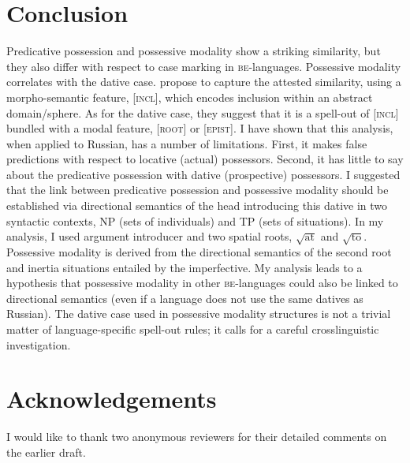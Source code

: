 \documentclass[output=paper,colorlinks,citecolor=brown,nonflat]{./langscibook}
\begin{document}
\section{Conclusion}\label{sec:tsedryk:5}

Predicative possession and possessive modality show a striking similarity, but they also differ with respect to case marking in \textsc{be}{}-languages. Possessive modality correlates with the dative case. \citet{BjorkmanCowper2016} propose to capture the attested similarity, using a morpho-semantic feature, [\textsc{incl}], which encodes inclusion within an abstract domain/sphere. As for the dative case, they suggest that it is a spell-out of [\textsc{incl}] bundled with a modal feature, [\textsc{root}] or [\textsc{epist}]. I have shown that this analysis, when applied to Russian, has a number of limitations. First, it makes false predictions with respect to locative (actual) possessors. Second, it has little to say about the predicative possession with dative (prospective) possessors. I suggested that the link between predicative possession and possessive modality should be established via directional semantics of the head introducing this dative in two syntactic contexts, NP (sets of individuals) and TP (sets of situations). In my analysis, I used  argument introducer and two spatial roots,  $\sqrt{\text{at}}$  and  $\sqrt{\text{to}}$. Possessive modality is derived from the directional semantics of the second root and inertia situations entailed by the imperfective. My analysis leads to a hypothesis that possessive modality in other \textsc{be}{}-languages could also be linked to directional semantics (even if a language does not use the same datives as Russian). The dative case used in possessive modality structures is not a trivial matter of language-specific spell-out rules; it calls for a careful crosslinguistic investigation.  

\section*{Acknowledgements}

I would like to thank two anonymous reviewers for their detailed comments on the earlier draft.

\sloppy\printbibliography[heading=subbibliography,notkeyword=this]
\end{document}

